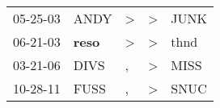 \begin{supertabular}{p{0.07\textwidth}p{0.06\textwidth}p{0.02\textwidth}p{0.02\textwidth}p{0.06\textwidth}}
 05-25-03\textsuperscript{} &           ANDY\textsuperscript{} &  \textgreater &  \textgreater &  JUNK\textsuperscript{} \\
 06-21-03\textsuperscript{} &  \textbf{reso\textsuperscript{}} &  \textgreater &  \textgreater &  thnd\textsuperscript{} \\
 03-21-06\textsuperscript{} &           DIVS\textsuperscript{} &             , &  \textgreater &  MISS\textsuperscript{} \\
 10-28-11\textsuperscript{} &           FUSS\textsuperscript{} &             , &  \textgreater &  SNUC\textsuperscript{} \\
\end{supertabular}
